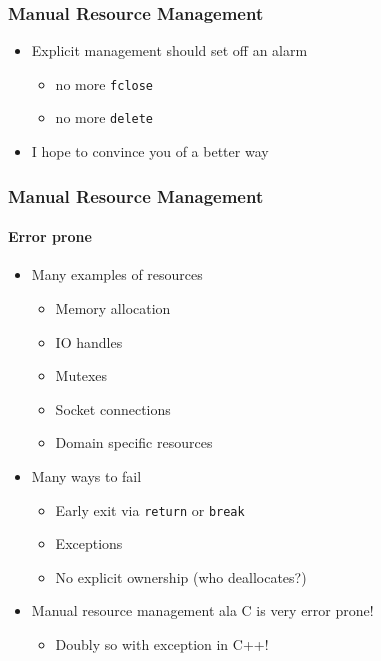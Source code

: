 \begin{frame}[fragile]
    \frametitle{Manual Resource Management}
    \begin{itemize}
        \item Explicit management should set off an alarm
            \begin{itemize}
                \item no more \texttt{fclose}
                \item no more \texttt{delete}
            \end{itemize}
        \item I hope to convince you of a better way
    \end{itemize}
\end{frame}

\begin{frame}
    \frametitle{Manual Resource Management}
    \framesubtitle{Error prone}
    \begin{itemize}
        \item Many examples of resources
            \begin{itemize}
                \item Memory allocation
                \item IO handles
                \item Mutexes
                \item Socket connections
                \item Domain specific resources
            \end{itemize}
        \item Many ways to fail
            \begin{itemize}
                \item Early exit via \texttt{return} or \texttt{break}
                \item Exceptions
                \item No explicit ownership (who deallocates?)
            \end{itemize}
        \item Manual resource management ala C is very error prone!
            \begin{itemize}
                \item Doubly so with exception in C++!
            \end{itemize}
    \end{itemize}
\end{frame}


